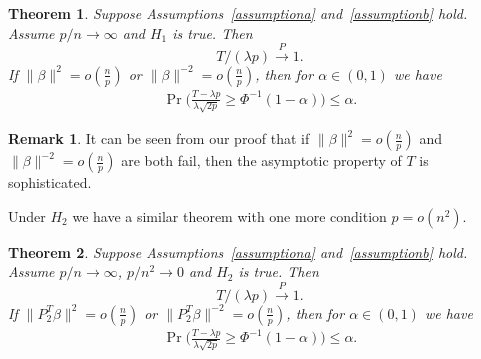 \documentclass[review]{elsarticle}
\theoremstyle{plain}
\newtheorem{theorem}{\quad\quad Theorem}
\theoremstyle{definition}
\newtheorem{remark}{\quad\quad Remark}
\theoremstyle{remark}
\begin{document}
\begin{theorem}\label{theorema}
    Suppose Assumptions~\ref{assumptiona} and~\ref{assumptionb} hold.
    Assume $p/n \to  \infty$ and $H_1$ is true. Then
            \begin{equation*}
                T/(\lambda p) \xrightarrow{P} 1.
            \end{equation*}
    If $\|\beta\|^2=o(\frac{{n}}{{p}})$ or $\|\beta\|^{-2}=o(\frac{{n}}{{p}})$, then for $\alpha\in (0,1)$ we have
\begin{equation*}
    \begin{aligned}
    \Pr\Big(\frac{T-\lambda p}{\lambda\sqrt{2p}}\geq \Phi^{-1}(1-\alpha)\Big)\leq \alpha.
    \end{aligned}
\end{equation*}
\end{theorem}
\begin{remark}
   It can be seen from our proof that if $\|\beta\|^2=o(\frac{{n}}{{p}})$ and $\|\beta\|^{-2}=o(\frac{{n}}{{p}})$ are both fail, then the asymptotic property of $T$ is sophisticated.
\end{remark}
Under $H_2$ we have a similar theorem with one more condition $p=o(n^2)$.
\begin{theorem}\label{theoremb}
    Suppose Assumptions~\ref{assumptiona} and~\ref{assumptionb} hold.
    Assume $p/n \to  \infty$, $p/n^2 \to 0$ and $H_2$ is true. Then
            \begin{equation*}
                T/(\lambda p) \xrightarrow{P} 1.
            \end{equation*}
    If $\|P_2^T\beta\|^2=o(\frac{{n}}{{p}})$ or $\|P_2^T\beta\|^{-2}=o(\frac{{n}}{{p}})$, then for $\alpha\in (0,1)$ we have
\begin{equation*}
    \begin{aligned}
    \Pr\Big(\frac{T-\lambda p}{\lambda\sqrt{2p}}\geq \Phi^{-1}(1-\alpha)\Big)\leq \alpha.
    \end{aligned}
\end{equation*}
\end{theorem}
\end{document}
